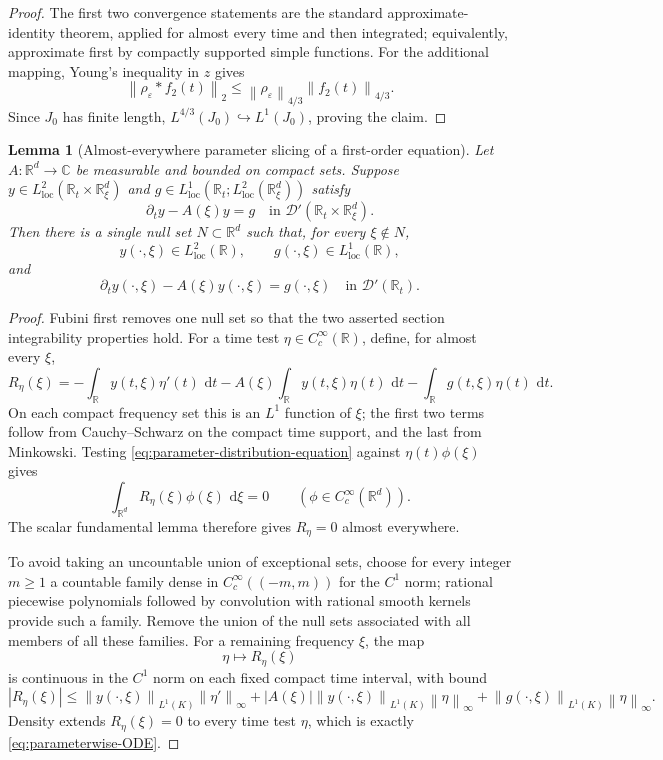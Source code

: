 \documentclass[11pt,oneside]{book}
\newtheorem{lemma}[theorem]{Lemma}
\theoremstyle{definition}
\theoremstyle{remark}
\newcommand{\R}{\mathbb R}
\newcommand{\C}{\mathbb C}
\newcommand{\D}{\mathcal D}
\newcommand{\1}{\mathbf 1}
\newcommand{\loc}{\mathrm{loc}}
\newcommand{\dd}{\,\mathrm d}
\newcommand{\norm}[1]{\left\lVert #1\right\rVert}
\newcommand{\eps}{\varepsilon}
\begin{document}
\begin{proof}
The first two convergence statements are the standard approximate-identity
theorem, applied for almost every time and then integrated; equivalently,
approximate first by compactly supported simple functions.  For the additional
mapping, Young's inequality in $z$ gives
\[
 \norm{\rho_\eps*f_2(t)}_2
 \le\norm{\rho_\eps}_{4/3}\norm{f_2(t)}_{4/3}.
\]
Since $J_0$ has finite length,
$L^{4/3}(J_0)\hookrightarrow L^1(J_0)$, proving the claim.
\end{proof}

\begin{lemma}[Almost-everywhere parameter slicing of a first-order equation]
\label{lem:parameterwise-distribution-ODE}
Let $A:\R^d\to\C$ be measurable and bounded on compact sets.  Suppose
$y\in L^2_{\loc}(\R_t\times\R^d_\xi)$ and
$g\in L^1_{\loc}(\R_t;L^2_{\loc}(\R^d_\xi))$ satisfy
\begin{equation}
 \partial_ty-A(\xi)y=g
 \quad\text{in }\D'(\R_t\times\R^d_\xi).          \label{eq:parameter-distribution-equation}
\end{equation}
Then there is a single null set $N\subset\R^d$ such that, for every
$\xi\notin N$,
\[
 y(\cdot,\xi)\in L^2_{\loc}(\R),\qquad
 g(\cdot,\xi)\in L^1_{\loc}(\R),
\]
and
\begin{equation}
 \partial_ty(\cdot,\xi)-A(\xi)y(\cdot,\xi)
 =g(\cdot,\xi)
 \quad\text{in }\D'(\R_t).                       \label{eq:parameterwise-ODE}
\end{equation}
\end{lemma}

\begin{proof}
Fubini first removes one null set so that the two asserted section
integrability properties hold.  For a time test $\eta\in C_c^\infty(\R)$,
define, for almost every $\xi$,
\[
 R_\eta(\xi)
 =-\int_\R y(t,\xi)\eta'(t)\,\dd t
  -A(\xi)\int_\R y(t,\xi)\eta(t)\,\dd t
  -\int_\R g(t,\xi)\eta(t)\,\dd t.
\]
On each compact frequency set this is an $L^1$ function of $\xi$; the first
two terms follow from Cauchy--Schwarz on the compact time support, and the
last from Minkowski.  Testing \eqref{eq:parameter-distribution-equation}
against $\eta(t)\phi(\xi)$ gives
\[
 \int_{\R^d}R_\eta(\xi)\phi(\xi)\,\dd\xi=0
 \qquad(\phi\in C_c^\infty(\R^d)).
\]
The scalar fundamental lemma therefore gives $R_\eta=0$ almost everywhere.

To avoid taking an uncountable union of exceptional sets, choose for every
integer $m\ge1$ a countable family dense in
$C_c^\infty((-m,m))$ for the $C^1$ norm; rational piecewise polynomials
followed by convolution with rational smooth kernels provide such a family.
Remove the union of the null sets associated with all members of all these
families.  For a remaining frequency $\xi$, the map
\[
 \eta\longmapsto R_\eta(\xi)
\]
is continuous in the $C^1$ norm on each fixed compact time interval, with
bound
\[
 |R_\eta(\xi)|
 \le \norm{y(\cdot,\xi)}_{L^1(K)}\norm{\eta'}_\infty
   +|A(\xi)|\norm{y(\cdot,\xi)}_{L^1(K)}\norm\eta_\infty
   +\norm{g(\cdot,\xi)}_{L^1(K)}\norm\eta_\infty.
\]
Density extends $R_\eta(\xi)=0$ to every time test $\eta$, which is exactly
\eqref{eq:parameterwise-ODE}.
\end{proof}
\end{document}
